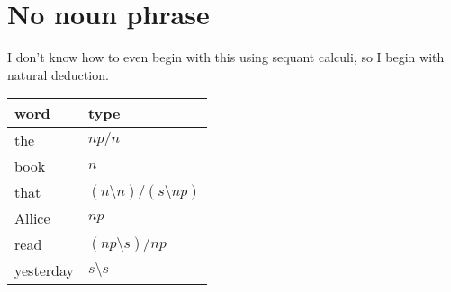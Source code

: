 \documentclass{article}
\begin{document}
\section{No noun phrase}
I don't know how to even begin with this using sequant calculi, so
I begin with natural deduction. \\
\begin{tabular}{@{}ll@{}}
	word & type \\ \toprule
	the & $np/n$ \\
	book & $n$ \\
	that & $(n\setminus n) /(s \setminus np)$ \\
	Allice & $np$ \\
	read & $(np \setminus s) / np$ \\
	yesterday & $s \setminus s$ \\
\end{tabular}

\begin{prooftree}
\end{prooftree}
\end{document}
